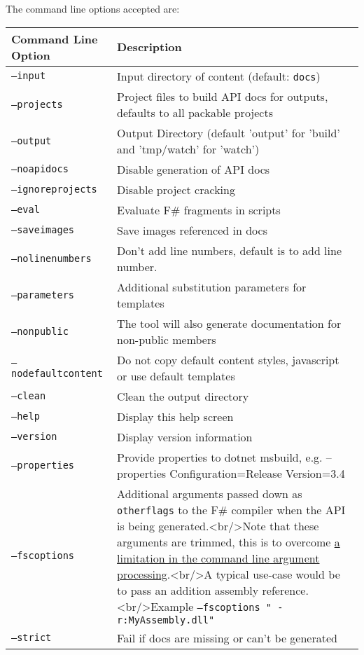 \documentclass{article}
\begin{document}
The command line options accepted are:
\begin{tabular}{|l|l|}\hline
\textbf{Command Line Option} & \textbf{Description}\\ \hline\hline
\texttt{--input} & Input directory of content (default: \texttt{docs})\\ \hline
\texttt{--projects} & Project files to build API docs for outputs, defaults to all packable projects\\ \hline
\texttt{--output} & Output Directory (default 'output' for 'build' and 'tmp/watch' for 'watch')\\ \hline
\texttt{--noapidocs} & Disable generation of API docs\\ \hline
\texttt{--ignoreprojects} & Disable project cracking\\ \hline
\texttt{--eval} & Evaluate F\# fragments in scripts\\ \hline
\texttt{--saveimages} & Save images referenced in docs\\ \hline
\texttt{--nolinenumbers} & Don't add line numbers, default is to add line number.\\ \hline
\texttt{--parameters} & Additional substitution parameters for templates\\ \hline
\texttt{--nonpublic} & The tool will also generate documentation for non-public members\\ \hline
\texttt{--nodefaultcontent} & Do not copy default content styles, javascript or use default templates\\ \hline
\texttt{--clean} & Clean the output directory\\ \hline
\texttt{--help} & Display this help screen\\ \hline
\texttt{--version} & Display version information\\ \hline
\texttt{--properties} & Provide properties to dotnet msbuild, e.g. --properties Configuration=Release Version=3.4\\ \hline
\texttt{--fscoptions} & Additional arguments passed down as \texttt{otherflags} to the F\# compiler when the API is being generated.<br/>Note that these arguments are trimmed, this is to overcome \href{https://github.com/commandlineparser/commandline/issues/58}{a limitation in the command line argument processing}.<br/>A typical use-case would be to pass an addition assembly reference.<br/>Example \texttt{--fscoptions " -r:MyAssembly.dll"}\\ \hline
\texttt{--strict} & Fail if docs are missing or can't be generated\\ \hline
\end{tabular}
\end{document}
